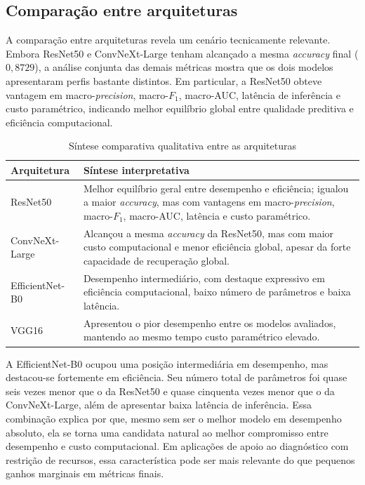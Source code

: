 \documentclass[tcc,capa]{texufpel}
\begin{document}
\subsection{Comparação entre arquiteturas}

A comparação entre arquiteturas revela um cenário tecnicamente relevante. Embora ResNet50 e ConvNeXt-Large tenham alcançado a mesma \textit{accuracy} final (\(0{,}8729\)), a análise conjunta das demais métricas mostra que os dois modelos apresentaram perfis bastante distintos. Em particular, a ResNet50 obteve vantagem em macro-\textit{precision}, macro-\(F_1\), macro-AUC, latência de inferência e custo paramétrico, indicando melhor equilíbrio global entre qualidade preditiva e eficiência computacional.

\begin{table}[htbp]
	\centering
	\caption{Síntese comparativa qualitativa entre as arquiteturas}
	\label{tab:comparacao_qualitativa_arquiteturas}
	\begin{tabular}{|l|p{9cm}|}
		\hline
		\textbf{Arquitetura} & \textbf{Síntese interpretativa} \\ \hline
		ResNet50 & Melhor equilíbrio geral entre desempenho e eficiência; igualou a maior \textit{accuracy}, mas com vantagens em macro-\textit{precision}, macro-\(F_1\), macro-AUC, latência e custo paramétrico. \\ \hline
		ConvNeXt-Large & Alcançou a mesma \textit{accuracy} da ResNet50, mas com maior custo computacional e menor eficiência global, apesar da forte capacidade de recuperação global. \\ \hline
		EfficientNet-B0 & Desempenho intermediário, com destaque expressivo em eficiência computacional, baixo número de parâmetros e baixa latência. \\ \hline
		VGG16 & Apresentou o pior desempenho entre os modelos avaliados, mantendo ao mesmo tempo custo paramétrico elevado. \\ \hline
	\end{tabular}
\end{table}

A EfficientNet-B0 ocupou uma posição intermediária em desempenho, mas destacou-se fortemente em eficiência. Seu número total de parâmetros foi quase seis vezes menor que o da ResNet50 e quase cinquenta vezes menor que o da ConvNeXt-Large, além de apresentar baixa latência de inferência. Essa combinação explica por que, mesmo sem ser o melhor modelo em desempenho absoluto, ela se torna uma candidata natural ao melhor compromisso entre desempenho e custo computacional. Em aplicações de apoio ao diagnóstico com restrição de recursos, essa característica pode ser mais relevante do que pequenos ganhos marginais em métricas finais.
\end{document}
